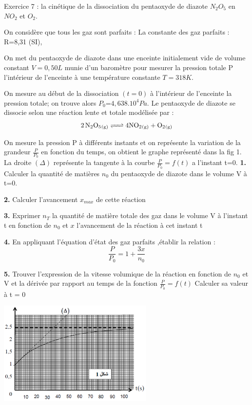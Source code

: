 \documentclass[12pt, french]{article}
\begin{document}
\begin{Box2}{Exercice 7 : la cinétique de la dissociation du pentaoxyde de diazote $N_2O_5$ en $NO_2$ et $O_2$.}

	On considère que tous les gaz sont parfaits : La constante des gaz parfaits : R=8,31 (SI),

On met du pentaoxyde de diazote dans une enceinte initialement vide de volume constant $V = 0,50L$ munie d’un baromètre pour mesurer la pression totale P l’intérieur de l’enceinte à une température constante
$T=318K$.

On mesure au début de la dissociation $(t = 0 )$ à l’intérieur de l’enceinte la pression totale; on trouve alors $P_0$=$4,638.10^4Pa$. Le pentaoxyde de diazote se dissocie selon une réaction lente et totale modélisée par :
$$\ce{2N_2O_5_{(g)} <=>{4NO_2}_{(g)} + {O_2}_{(g)} }$$

 On mesure la pression P à différents instants et on représente la variation de la grandeur $\frac{P}{P_0}$ en fonction du
temps, on obtient le graphe représenté dans la fig 1. La droite $(\Delta)$ représente la tangente à la courbe $\frac{P}{P_0} = f(t)$  a l’instant t=0.
\textbf{1. } Calculer la quantité de matières $n_0$ du
pentaoxyde de diazote dans le volume V à t=0.

\textbf{2. } Calculer l’avancement $x_{max}$ de cette réaction

\textbf{3. } Exprimer $n_T$ la quantité de matière totale des
gaz dans le volume V à l’instant t en
fonction de $n_0$ et $x$ l’avancement de la
réaction à cet instant t

\textbf{4. }En appliquant l’équation d’état des gaz
parfaits ,établir la relation : $$\frac{P}{P_0} = 1 +\frac{3x}{n_0}$$

\textbf{5. }Trouver l’expression de la vitesse volumique
de la réaction en fonction de $n_0$ et V et la
dérivée par rapport au temps de la fonction
$\frac{P}{P_0} = f(t)$ Calculer sa valeur à t = 0

  \begin{center}
	\includegraphics[width=0.58\textwidth]{./img/ex07.png}
  \end{center}


\end{Box2}
\end{document}
